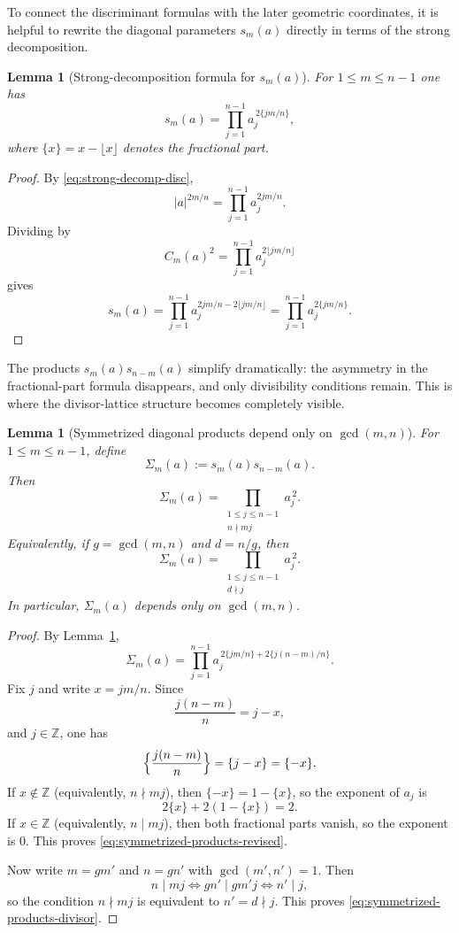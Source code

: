 \documentclass[11pt,letterpaper]{amsart}
\newcommand{\Z}{\mathbb{Z}}
\theoremstyle{plain}
\newtheorem{lemma}[theorem]{Lemma}
\theoremstyle{definition}
\begin{document}
To connect the discriminant formulas with the later geometric coordinates, it is helpful to rewrite the diagonal parameters \(s_m(a)\) directly in terms of the strong decomposition.

\begin{lemma}[Strong-decomposition formula for $s_m(a)$]\label{lem:s-strong}
For $1\le m\le n-1$ one has
\begin{equation}\label{eq:s-strong}
s_m(a)=\prod_{j=1}^{n-1} a_j^{\,2\{jm/n\}},
\end{equation}
where $\{x\}=x-\lfloor x\rfloor$ denotes the fractional part.
\end{lemma}

\begin{proof}
By \eqref{eq:strong-decomp-disc},
\[
|a|^{2m/n}=\prod_{j=1}^{n-1} a_j^{2jm/n}.
\]
Dividing by
\[
C_m(a)^2=\prod_{j=1}^{n-1} a_j^{2\lfloor jm/n\rfloor}
\]
gives
\[
s_m(a)=\prod_{j=1}^{n-1} a_j^{2jm/n-2\lfloor jm/n\rfloor}
=\prod_{j=1}^{n-1} a_j^{2\{jm/n\}}.
\]
\end{proof}

The products \(s_m(a)s_{n-m}(a)\) simplify dramatically: the asymmetry in the fractional-part formula disappears, and only divisibility conditions remain. This is where the divisor-lattice structure becomes completely visible.

\begin{lemma}[Symmetrized diagonal products depend only on $\gcd(m,n)$]
\label{lem:symmetrized-products-revised}
For $1\le m\le n-1$, define
\[
\Sigma_m(a):=s_m(a)s_{n-m}(a).
\]
Then
\begin{equation}\label{eq:symmetrized-products-revised}
\Sigma_m(a)=\prod_{\substack{1\le j\le n-1\\ n\nmid mj}} a_j^{\,2}.
\end{equation}
Equivalently, if $g=\gcd(m,n)$ and $d=n/g$, then
\begin{equation}\label{eq:symmetrized-products-divisor}
\Sigma_m(a)=\prod_{\substack{1\le j\le n-1\\ d\nmid j}} a_j^{\,2}.
\end{equation}
In particular, $\Sigma_m(a)$ depends only on $\gcd(m,n)$.
\end{lemma}

\begin{proof}
By Lemma~\ref{lem:s-strong},
\[
\Sigma_m(a)
=\prod_{j=1}^{n-1} a_j^{\,2\{jm/n\}+2\{j(n-m)/n\}}.
\]
Fix $j$ and write $x=jm/n$.
Since
\[
\frac{j(n-m)}{n}=j-x,
\]
and $j\in \Z$, one has
\[
\Bigl\{\frac{j(n-m)}{n}\Bigr\}=\{j-x\}=\{-x\}.
\]
If $x\notin \Z$ (equivalently, $n\nmid mj$), then $\{-x\}=1-\{x\}$, so the exponent of $a_j$ is
\[
2\{x\}+2(1-\{x\})=2.
\]
If $x\in \Z$ (equivalently, $n\mid mj$), then both fractional parts vanish, so the exponent is $0$.
This proves \eqref{eq:symmetrized-products-revised}.

Now write $m=gm'$ and $n=gn'$ with $\gcd(m',n')=1$.
Then
\[
n\mid mj
\iff gn'\mid gm'j
\iff n'\mid j,
\]
so the condition $n\nmid mj$ is equivalent to $n'=d\nmid j$.
This proves \eqref{eq:symmetrized-products-divisor}.
\end{proof}
\end{document}
